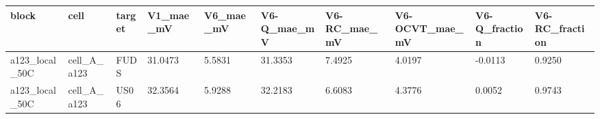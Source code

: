 \begin{tabular}{llllllllll}
\hline
block & cell & target & V1\_mae\_mV & V6\_mae\_mV & V6-Q\_mae\_mV & V6-RC\_mae\_mV & V6-OCVT\_mae\_mV & V6-Q\_fraction & V6-RC\_fraction \\
\hline
a123\_local\_50C & cell\_A\_a123 & FUDS & 31.0473 & 5.5831 & 31.3353 & 7.4925 & 4.0197 & -0.0113 & 0.9250 \\
a123\_local\_50C & cell\_A\_a123 & US06 & 32.3564 & 5.9288 & 32.2183 & 6.6083 & 4.3776 & 0.0052 & 0.9743 \\
\hline
\end{tabular}
